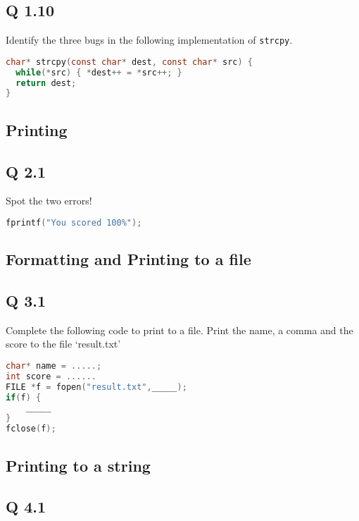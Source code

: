 \subsection{Q 1.10}\label{q-1.10}

Identify the three bugs in the following implementation of \texttt{strcpy}.

\begin{lstlisting}[language=C]
char* strcpy(const char* dest, const char* src) {
  while(*src) { *dest++ = *src++; }
  return dest;
}
\end{lstlisting}

\subsection{Printing}\label{printing}

\subsection{Q 2.1}\label{q-2.1}

Spot the two errors!

\begin{lstlisting}[language=C]
fprintf("You scored 100%");
\end{lstlisting}

\subsection{Formatting and Printing to a file}\label{formatting-and-printing-to-a-file}

\subsection{Q 3.1}\label{q-3.1}

Complete the following code to print to a file. Print the name, a comma and the score to the file `result.txt'

\begin{lstlisting}[language=C]
char* name = .....;
int score = ......
FILE *f = fopen("result.txt",_____);
if(f) {
    _____
}
fclose(f);
\end{lstlisting}

\subsection{Printing to a string}\label{printing-to-a-string}

\subsection{Q 4.1}\label{q-4.1}


